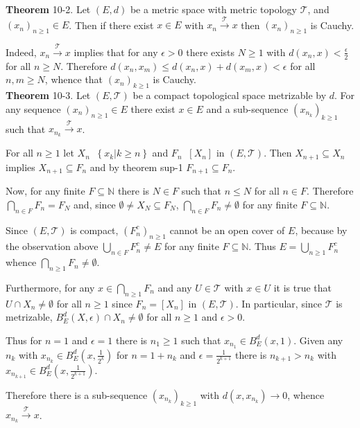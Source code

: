 \documentclass[a4paper]{article}
\newcommand{\obj}[1]{\left\{ #1 \right \}}
\newcommand{\clo}[1]{\left [ #1 \right ]}
\newcommand{\brac}[1]{\left ( #1 \right )}
\newcommand{\induc}[1]{\left . #1 \right \vert}
\newcommand{\Tcal}{\mathcal{T}}
\newcommand{\defn}{\mathop{\overset{\Delta}{=}}\nolimits}
\begin{document}
\label{thm:conv_seq_cauchy} \noindent \textbf{Theorem} 10-2.
Let $\brac{E,d}$ be a metric space with metric topology $\Tcal$, and $\brac{x_n}_{n\geq 1}\in E$. Then if there exist $x\in E$ with $x_n\overset{\Tcal}{\to} x$ then $\brac{x_n}_{n\geq 1}$ is Cauchy.

Indeed, $x_n\overset{\Tcal}{\to} x$ implies that for any $\epsilon>0$ there exists $N\geq 1$ with $d\brac{x_n, x}<\frac{\epsilon}{2}$ for all $n\geq N$. Therefore $d\brac{x_n, x_m} \leq d\brac{x_n, x} + d\brac{x_m, x}< \epsilon$ for all $n,m\geq N$, whence that $\brac{x_n}_{k\geq 1}$ is Cauchy.\\

\label{thm:compact_subseq} \noindent \textbf{Theorem} 10-3.
Let $\brac{E,\Tcal}$ be a compact topological space metrizable by $d$. For any sequence $\brac{x_n}_{n\geq 1}\in E$ there exist $x\in E$ and a sub-sequence $\brac{x_{n_k}}_{k\geq 1}$ such that $x_{n_k}\overset{\Tcal}{\to} x$.

For all $n\geq 1$ let $X_n\defn\obj{\induc{x_k} k\geq n}$ and $F_n\defn \clo{X_n}$ in $\brac{E, \Tcal}$. Then $X_{n+1}\subseteq X_n$ implies $X_{n+1}\subseteq F_n$ and by theorem sup-1 $F_{n+1}\subseteq F_n$.

Now, for any finite $F\subseteq \mathbb{N}$ there is $N\in F$ such that $n\leq N$ for all $n\in F$. Therefore $\bigcap_{n\in F} F_n = F_N$ and, since $\emptyset \neq X_N\subseteq F_N$, $\bigcap_{n\in F} F_n \neq \emptyset$ for any finite $F\subseteq \mathbb{N}$.

Since $\brac{E,\Tcal}$ is compact, $\brac{F_n^c}_{n\geq 1}$ cannot be an open cover of $E$, because by the observation above $\bigcup_{n\in F} F_n^c \neq E$ for any finite $F\subseteq \mathbb{N}$. Thus $E = \bigcup_{n\geq 1} F_n^c$ whence $\bigcap_{n\geq 1} F_n \neq \emptyset$.

Furthermore, for any $x\in \bigcap_{n\geq 1} F_n$ and any $U\in \Tcal$ with $x\in U$ it is true that $U\cap X_n \neq \emptyset$ for all $n\geq 1$ since $F_n=\clo{X_n}$ in $\brac{E, \Tcal}$. In particular, since $\Tcal$ is metrizable, $B^d_E\brac{X, \epsilon}\cap X_n\neq \emptyset$ for all $n\geq 1$ and $\epsilon > 0$.

Thus for $n=1$ and $\epsilon=1$ there is $n_1\geq 1$ such that $x_{n_1}\in B^d_E\brac{x, 1}$. Given any $n_k$ with $x_{n_k}\in B^d_E\brac{x, \frac{1}{2^k}}$ for $n=1+n_k$ and $\epsilon=\frac{1}{2^{k+1}}$ there is $n_{k+1}>n_k$ with $x_{n_{k+1}}\in B^d_E\brac{x, \frac{1}{2^{k+1}}}$.

Therefore there is a sub-sequence $\brac{x_{n_k}}_{k\geq 1}$ with $d\brac{x, x_{n_k}}\to 0$, whence $x_{n_k}\overset{\Tcal}{\to} x$.\\
\end{document}
